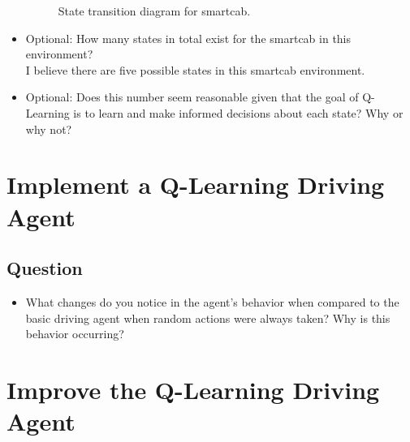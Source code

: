 \documentclass[twoside,openright,titlepage,numbers=noenddot,headinclude,%
               footinclude=true,cleardoublepage=empty,abstractoff,BCOR=5mm,%
               paper=a4,fontsize=11pt,ngerman,american]{scrreprt}
\numberwithin{theorem}{chapter}
\numberwithin{definition}{chapter}
\numberwithin{algorithm}{chapter}
\numberwithin{figure}{chapter}
\numberwithin{table}{chapter}
\numberwithin{equation}{chapter}
\begin{document}
\begin{itemize}
\begin{figure}
\caption{State transition diagram for smartcab.}\label{fig:greenLight}
\end{figure}



\item Optional: How many states in total exist for the smartcab in this environment? \\ I believe there are five possible states in this smartcab environment.

\item Optional: Does this number seem reasonable given that the goal of Q-Learning is to learn and make informed decisions about each state? Why or why not?
\end{itemize}





%
%

\chapter*{Implement a Q-Learning Driving Agent}

\section*{Question}

\begin{itemize}
\item What changes do you notice in the agent's behavior when compared to the basic driving agent when random actions were always taken? Why is this behavior occurring?

\end{itemize}


%
%

\chapter*{Improve the Q-Learning Driving Agent}
\end{document}
